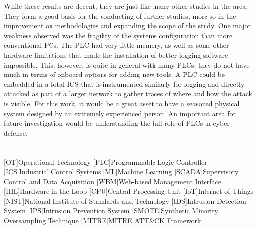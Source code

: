 \documentclass[Master,BMR,english]{twbook}
\begin{document}
While these results are decent, they are just like many other studies in the area. They form a good basis for the conducting of further studies, more so in the improvement on methodologies and expanding the scope of the study. One major weakness observed was the fragility of the systems configuration than more conventional PCs. The PLC had very little memory, as well as some other hardware limitations that made the installation of better logging software impossible. This, however, is quite in general with many PLCs; they do not have much in terms of onboard options for adding new tools. A PLC could be embedded in a total ICS that is instrumented similarly for logging and directly attacked as part of a larger network to gather traces of where and how the attack is visible. For this work, it would be a great asset to have a seasoned physical system designed by an extremely experienced person. An important area for future investigation would be understanding the full role of PLCs in cyber defense.




\clearpage                                                       %

\printbib                                                        %
\clearpage

\listoffigures                                                   %
\clearpage

\listoftables                                                    %
\clearpage

\listoflistings                                                  %
\clearpage

{}
\chapter*{\listacroname}
\begin{acronym}[XXXXX]
    [OT]{Operational Technology}
    [PLC]{Programmable Logic Controller}
    [ICS]{Industrial Control Systems}
    [ML]{Machine Learning}
    [SCADA]{Supervisory Control and Data Acquisition}
    [WBM]{Web-based Management Interface}
    [HIL]{Hardware-in-the-Loop}
    [CPU]{Central Processing Unit}
    [IoT]{Internet of Things}
    [NIST]{National Institute of Standards and Technology}
    [IDS]{Intrusion Detection System}
    [IPS]{Intrusion Prevention System}
    [SMOTE]{Synthetic Minority Oversampling Technique}
    [MITRE]{MITRE ATT\&CK Framework}
\end{acronym}%
\clearpage
\appendix
\end{document}
